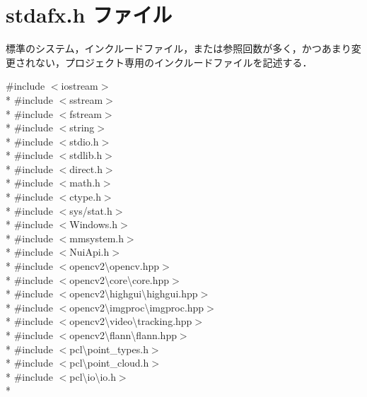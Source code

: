 \section{stdafx.\-h ファイル}
\label{stdafx_8h}


標準のシステム，インクルードファイル，または参照回数が多く，かつあまり変更されない，プロジェクト専用のインクルードファイルを記述する．  


{\ttfamily \#include $<$iostream$>$}\\*
{\ttfamily \#include $<$sstream$>$}\\*
{\ttfamily \#include $<$fstream$>$}\\*
{\ttfamily \#include $<$string$>$}\\*
{\ttfamily \#include $<$stdio.\-h$>$}\\*
{\ttfamily \#include $<$stdlib.\-h$>$}\\*
{\ttfamily \#include $<$direct.\-h$>$}\\*
{\ttfamily \#include $<$math.\-h$>$}\\*
{\ttfamily \#include $<$ctype.\-h$>$}\\*
{\ttfamily \#include $<$sys/stat.\-h$>$}\\*
{\ttfamily \#include $<$Windows.\-h$>$}\\*
{\ttfamily \#include $<$mmsystem.\-h$>$}\\*
{\ttfamily \#include $<$Nui\-Api.\-h$>$}\\*
{\ttfamily \#include $<$opencv2\textbackslash{}opencv.\-hpp$>$}\\*
{\ttfamily \#include $<$opencv2\textbackslash{}core\textbackslash{}core.\-hpp$>$}\\*
{\ttfamily \#include $<$opencv2\textbackslash{}highgui\textbackslash{}highgui.\-hpp$>$}\\*
{\ttfamily \#include $<$opencv2\textbackslash{}imgproc\textbackslash{}imgproc.\-hpp$>$}\\*
{\ttfamily \#include $<$opencv2\textbackslash{}video\textbackslash{}tracking.\-hpp$>$}\\*
{\ttfamily \#include $<$opencv2\textbackslash{}flann\textbackslash{}flann.\-hpp$>$}\\*
{\ttfamily \#include $<$pcl\textbackslash{}point\-\_\-types.\-h$>$}\\*
{\ttfamily \#include $<$pcl\textbackslash{}point\-\_\-cloud.\-h$>$}\\*
{\ttfamily \#include $<$pcl\textbackslash{}io\textbackslash{}io.\-h$>$}\\*
